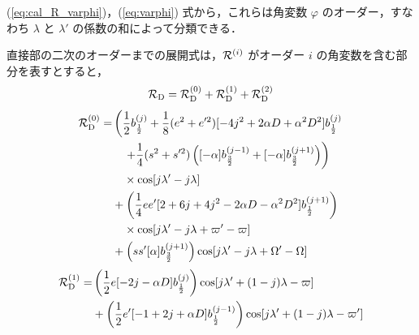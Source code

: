 \documentclass[11pt,a4paper,oneside,onecolumn]{jarticle}
\begin{document}
(\ref{eq:cal_R_varphi})，(\ref{eq:varphi}) 式から，これらは角変数 $\varphi$ のオーダー，すなわち $\lambda$ と $\lambda'$ の係数の和によって分類できる．

直接部の二次のオーダーまでの展開式は，${\cal R}^{(i)}$ がオーダー $i$ の角変数を含む部分を表すとすると，
\begin{equation}
{\cal R}_{\rm D} =  {\cal R}_{\rm D}^{(0)} + {\cal R}_{\rm D}^{(1)} + {\cal R}_{\rm D}^{(2)} \label{eq:cal_RD(012)}
\end{equation}
\begin{equation}
\begin{split}
{\cal R}_{\rm D}^{(0)} = & \left( \frac{1}{2} b_{ \frac{1}{2} }^{(j)} + \frac{1}{8} (e^2 + e'^2) [ -4 j^2 + 2 \alpha D + \alpha^2 D^2 ] b_{ \frac{1}{2} }^{(j)} \right. \\
& \left. \quad + \frac{1}{4} (s^2 + s'^2) \left( [- \alpha ] b_{ \frac{3}{2} }^{(j - 1)} + [- \alpha ] b_{ \frac{3}{2} }^{(j + 1)} \right) \right) \\
& \quad \times \cos [j \lambda' - j \lambda ] \\
& + \left( \frac{1}{4} e e' [ 2 + 6j + 4 j^2 - 2 \alpha D - \alpha^2 D^2] b_{ \frac{1}{2} }^{(j + 1)} \right) \\
& \quad \times \cos [j \lambda' - j \lambda + \varpi' - \varpi ] \\
& + \left( s s' [ \alpha ] b_{ \frac{3}{2} }^{(j + 1)} \right) \cos [ j \lambda' - j \lambda + \Omega' - \Omega ]
\end{split} \label{eq:cal_RD(0)}
\end{equation}
\begin{equation}
\begin{split}
{\cal R}_{\rm D}^{(1)} = & \left( \frac{1}{2} e [-2 j - \alpha D] b_{ \frac{1}{2} }^{(j)} \right) \cos [j \lambda' + (1 -j) \lambda - \varpi ] \\
& + \left( \frac{1}{2} e' [ -1 + 2 j + \alpha D] b_{ \frac{1}{2} }^{(j - 1)} \right) \cos [j \lambda' + (1 -j) \lambda - \varpi' ]
\end{split}  \label{eq:cal_RD(1)}
\end{equation}
\end{document}
